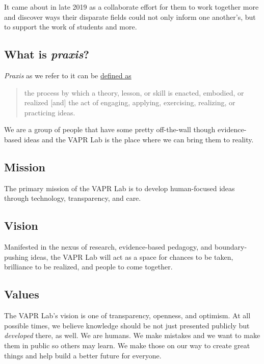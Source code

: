 \documentclass[
  12pt,
]{memoir}
\begin{document}
It came about in late 2019 as a collaborate effort for them to work together more and discover ways their disparate fields could not only inform one another's, but to support the work of students and more.

\hypertarget{what-is-praxis}{%
\subsection*{\texorpdfstring{What is \emph{praxis}?}{What is praxis?}}\label{what-is-praxis}}

\emph{Praxis} as we refer to it can be \href{https://en.wikipedia.org/wiki/Praxis_(process)}{defined as}

\begin{quote}
the process by which a theory, lesson, or skill is enacted, embodied, or realized {[}and{]} the act of engaging, applying, exercising, realizing, or practicing ideas.
\end{quote}

We are a group of people that have some pretty off-the-wall though evidence-based ideas and the VAPR Lab is the place where we can bring them to reality.

\hypertarget{mission}{%
\subsection*{Mission}\label{mission}}

The primary mission of the VAPR Lab is to develop human-focused ideas through technology, transparency, and care.

\hypertarget{vision}{%
\subsection*{Vision}\label{vision}}

Manifested in the nexus of research, evidence-based pedagogy, and boundary-pushing ideas, the VAPR Lab will act as a space for chances to be taken, brilliance to be realized, and people to come together.

\hypertarget{values}{%
\subsection*{Values}\label{values}}

The VAPR Lab's vision is one of transparency, openness, and optimism. At all possible times, we believe knowledge should be not just presented publicly but \emph{developed} there, as well. We are humans. We make mistakes and we want to make them in public so others may learn. We make those on our way to create great things and help build a better future for everyone.
\end{document}
